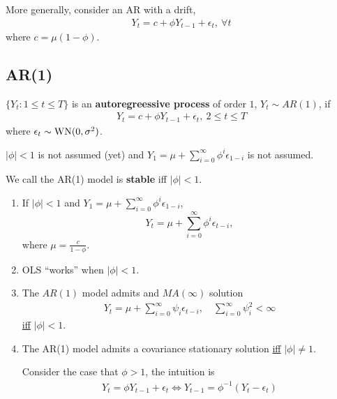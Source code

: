 \documentclass[11pt]{elegantbook}
\begin{document}
More generally, consider an AR with a drift,
\begin{equation}
    \begin{aligned}
        Y_t=c+\phi Y_{t-1}+\epsilon_t,\ \forall t
    \end{aligned}
    \nonumber
\end{equation}
where $c=\mu(1-\phi)$.

\subsection{AR(1)}
\begin{definition}[$AR(1)$]
    $\{Y_t:1\leq t\leq T\}$ is an \textbf{autoregreessive process} of order $1$, $Y_t\sim AR(1)$, if
    \begin{equation}
        \begin{aligned}
            Y_t=c+\phi Y_{t-1}+\epsilon_t,\ 2\leq t\leq T
        \end{aligned}
        \nonumber
    \end{equation}
    where $\epsilon_t\sim \textnormal{WN}(0,\sigma^2)$.
    \begin{note}
        $|\phi|<1$ is not assumed (yet) and $Y_1=\mu+\sum_{i=0}^\infty \phi^i\epsilon_{1-i}$ is not assumed.
    \end{note}
    We call the AR(1) model is \textbf{stable} iff $|\phi|<1$.
\end{definition}
\begin{enumerate}[$\circ$]
    \item If $|\phi|<1$ and $Y_1=\mu+\sum_{i=0}^\infty \phi^i\epsilon_{1-i}$, $$Y_t=\mu+\sum_{i=0}^\infty \phi^i\epsilon_{t-i},$$ where $\mu=\frac{c}{1-\phi}$.
    \item OLS ``works'' when $|\phi|<1$.
    \item The $AR(1)$ model admits and $MA(\infty)$ solution
    \begin{equation}
        \begin{aligned}
            Y_t=\mu+\sum_{i=0}^\infty \psi_i\epsilon_{t-i},\quad \sum_{i=0}^\infty \psi_i^2<\infty
        \end{aligned}
        \nonumber
    \end{equation}
    \underline{iff} $|\phi|<1$.
    \item The AR(1) model admits a covariance stationary solution \underline{iff} $|\phi|\neq 1$.
    \begin{note}
        Consider the case that $\phi>1$, the intuition is
        \begin{equation}
            \begin{aligned}
                Y_t=\phi Y_{t-1}+\epsilon_t \Leftrightarrow Y_{t-1}=\phi^{-1}(Y_t-\epsilon_t)
            \end{aligned}
            \nonumber
        \end{equation}
    \end{note}
\end{enumerate}
\end{document}
